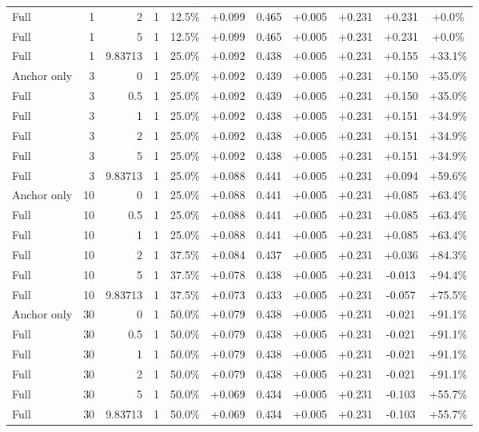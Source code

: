 \begin{table}[htbp]
\begin{tabular}{lrrrccccccc}
Full & 1 & 2 & 1 & 12.5\% & +0.099 & 0.465 & +0.005 & +0.231 & +0.231 & +0.0\% \\
Full & 1 & 5 & 1 & 12.5\% & +0.099 & 0.465 & +0.005 & +0.231 & +0.231 & +0.0\% \\
Full & 1 & 9.83713 & 1 & 25.0\% & +0.092 & 0.438 & +0.005 & +0.231 & +0.155 & +33.1\% \\
Anchor only & 3 & 0 & 1 & 25.0\% & +0.092 & 0.439 & +0.005 & +0.231 & +0.150 & +35.0\% \\
Full & 3 & 0.5 & 1 & 25.0\% & +0.092 & 0.439 & +0.005 & +0.231 & +0.150 & +35.0\% \\
Full & 3 & 1 & 1 & 25.0\% & +0.092 & 0.438 & +0.005 & +0.231 & +0.151 & +34.9\% \\
Full & 3 & 2 & 1 & 25.0\% & +0.092 & 0.438 & +0.005 & +0.231 & +0.151 & +34.9\% \\
Full & 3 & 5 & 1 & 25.0\% & +0.092 & 0.438 & +0.005 & +0.231 & +0.151 & +34.9\% \\
Full & 3 & 9.83713 & 1 & 25.0\% & +0.088 & 0.441 & +0.005 & +0.231 & +0.094 & +59.6\% \\
Anchor only & 10 & 0 & 1 & 25.0\% & +0.088 & 0.441 & +0.005 & +0.231 & +0.085 & +63.4\% \\
Full & 10 & 0.5 & 1 & 25.0\% & +0.088 & 0.441 & +0.005 & +0.231 & +0.085 & +63.4\% \\
Full & 10 & 1 & 1 & 25.0\% & +0.088 & 0.441 & +0.005 & +0.231 & +0.085 & +63.4\% \\
Full & 10 & 2 & 1 & 37.5\% & +0.084 & 0.437 & +0.005 & +0.231 & +0.036 & +84.3\% \\
Full & 10 & 5 & 1 & 37.5\% & +0.078 & 0.438 & +0.005 & +0.231 & -0.013 & +94.4\% \\
Full & 10 & 9.83713 & 1 & 37.5\% & +0.073 & 0.433 & +0.005 & +0.231 & -0.057 & +75.5\% \\
Anchor only & 30 & 0 & 1 & 50.0\% & +0.079 & 0.438 & +0.005 & +0.231 & -0.021 & +91.1\% \\
Full & 30 & 0.5 & 1 & 50.0\% & +0.079 & 0.438 & +0.005 & +0.231 & -0.021 & +91.1\% \\
Full & 30 & 1 & 1 & 50.0\% & +0.079 & 0.438 & +0.005 & +0.231 & -0.021 & +91.1\% \\
Full & 30 & 2 & 1 & 50.0\% & +0.079 & 0.438 & +0.005 & +0.231 & -0.021 & +91.1\% \\
Full & 30 & 5 & 1 & 50.0\% & +0.069 & 0.434 & +0.005 & +0.231 & -0.103 & +55.7\% \\
Full & 30 & 9.83713 & 1 & 50.0\% & +0.069 & 0.434 & +0.005 & +0.231 & -0.103 & +55.7\% \\

\end{tabular}
\end{table}
